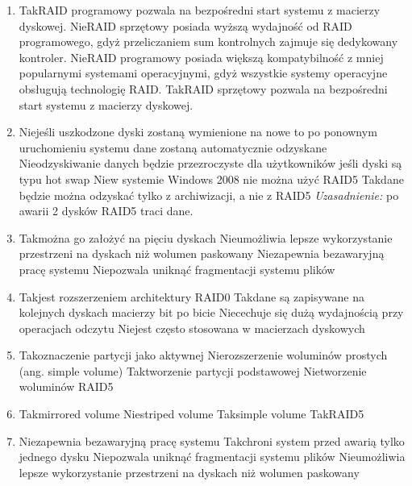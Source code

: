 \begin{enumerate}
		\newpage
		\item {}%
		{Tak}{RAID programowy pozwala na bezpośredni start systemu z macierzy dyskowej.}%
		{Nie}{RAID sprzętowy posiada wyższą wydajność od RAID programowego, gdyż przeliczaniem sum kontrolnych zajmuje się dedykowany kontroler.}%
		{Nie}{RAID programowy posiada większą kompatybilność z mniej popularnymi systemami operacyjnymi, gdyż wszystkie systemy operacyjne obsługują technologię RAID.}%
		{Tak}{RAID sprzętowy pozwala na bezpośredni start systemu z macierzy dyskowej.}
		\item {}
		{Nie}{jeśli uszkodzone dyski zostaną wymienione na nowe to po ponownym uruchomieniu systemu dane zostaną automatycznie odzyskane}
		{Nie}{odzyskiwanie danych będzie przezroczyste dla użytkowników jeśli dyski są typu hot swap}
		{Nie}{w systemie Windows 2008 nie można użyć RAID5}
		{Tak}{dane będzie można odzyskać tylko z archiwizacji, a nie z RAID5}
		{\small \emph{Uzasadnienie:} po awarii 2 dysków RAID5 traci dane.}
		\item {}%
		{Tak}{można go założyć na pięciu dyskach}%
		{Nie}{umożliwia lepsze wykorzystanie przestrzeni na dyskach niż wolumen paskowany}%
		{Nie}{zapewnia bezawaryjną pracę systemu}%
		{Nie}{pozwala uniknąć fragmentacji systemu plików}
		\item {}%
		{Tak}{jest rozszerzeniem architektury RAID0}%
		{Tak}{dane są zapisywane na kolejnych dyskach macierzy bit po bicie}%
		{Nie}{cechuje się dużą wydajnością przy operacjach odczytu}%
		{Nie}{jest często stosowana w macierzach dyskowych}
		\item {}%
		{Tak}{oznaczenie partycji jako aktywnej}%
		{Nie}{rozszerzenie woluminów prostych (ang. simple volume)}%
		{Tak}{tworzenie partycji podstawowej}%
		{Nie}{tworzenie woluminów RAID5}
		\item {}%
		{Tak}{mirrored volume}%
		{Nie}{striped volume}%
		{Tak}{simple volume}%
		{Tak}{RAID5}
		\item {}%
		{Nie}{zapewnia bezawaryjną pracę systemu}%
		{Tak}{chroni system przed awarią tylko jednego dysku}%
		{Nie}{pozwala uniknąć fragmentacji systemu plików}%
		{Nie}{umożliwia lepsze wykorzystanie przestrzeni na dyskach niż wolumen paskowany}%
		
		
	\end{enumerate}